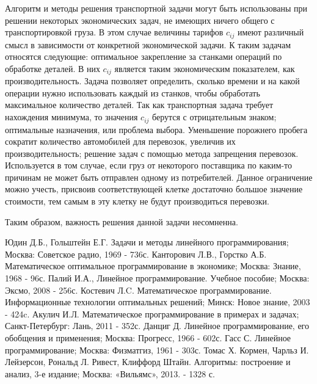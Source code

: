 \documentclass[a4paper,12pt]{article}
\begin{document}
	Алгоритм и методы решения транспортной задачи могут быть использованы при решении некоторых экономических задач, не имеющих ничего общего с транспортировкой груза. В этом случае величины тарифов $c_{ij}$ имеют различный смысл в зависимости от конкретной экономической задачи. К таким задачам относятся следующие: оптимальное закрепление за станками операций по обработке деталей. В них $c_{ij}$ является таким экономическим показателем, как производительность. Задача позволяет определить, сколько времени и на какой операции нужно использовать каждый из станков, чтобы обработать максимальное количество деталей. Так как транспортная задача требует нахождения минимума, то значения $c_{ij}$ берутся с отрицательным знаком; оптимальные назначения, или проблема выбора. Уменьшение порожнего пробега сократит количество автомобилей для перевозок, увеличив их производительность; решение задач с помощью метода запрещения перевозок. Используется в том случае, если груз от некоторого поставщика по каким-то причинам не может быть отправлен одному из потребителей. Данное ограничение можно учесть, присвоив соответствующей клетке достаточно большое значение стоимости, тем самым в эту клетку не будут производиться перевозки. 
	
	Таким образом, важность решения данной задачи несомненна.
	
	\clearpage
	
\begin{thebibliography}{99}
	Юдин Д.Б., Гольштейн Е.Г. Задачи и методы линейного программирования;
	Москва: Советское радио, 1969 - 736с.
	Канторович Л.В., Горстко А.Б. Математическое оптимальное программирование  в экономике;
	Москва: Знание, 1968 - 96с.
	Палий И.А., Линейное программирование. Учебное пособие;
	Москва: Эксмо, 2008 - 256с.
	Костевич Л.C. Математическое программирование. Информационные технологии оптимальных решений;
	Минск: Новое знание, 2003 - 424c.
	Акулич И.Л. Математическое программирование в примерах и задачах; Санкт-Петербург: Лань, 2011 - 352с.
	Данциг Д. Линейное программирование, его обобщения и применения; Москва: Прогресс, 1966 - 602с.
	Гасс С. Линейное программирование; Москва: Физматгиз, 1961 - 303с.
	Томас Х. Кормен, Чарльз И. Лейзерсон, Рональд Л. Ривест, Клиффорд Штайн. Алгоритмы: построение и анализ, 3-е издание; Москва: «Вильямс», 2013. - 1328 с.
\end{thebibliography}
\end{document}
